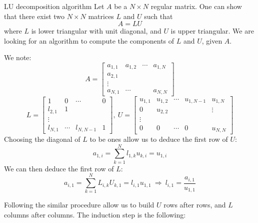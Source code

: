 \begin{section}{LU decomposition algorithm}
  Let $A$ be a $N\times N$ regular matrix. One can show that there
  exist two $N\times N$ matrices $L$ and $U$ such that
  \begin{equation}
    A = LU
  \end{equation}
  where $L$ is lower triangular with unit diagonal, and $U$ is upper
  triangular. We are looking for an algorithm to compute the
  components of $L$ and $U$, given $A$.

  We note:
  \begin{equation}
    A = 
    \begin{bmatrix}
      a_{1,1} & a_{1,2} &\cdots & a_{1,N}\\
      a_{2,1}\\
      \vdots\\
      a_{N,1} & \cdots & & a_{N,N}
    \end{bmatrix}
  \end{equation}
  \begin{equation}
    L = 
    \begin{bmatrix}
      1 & 0 &\cdots & 0\\
      l_{2,1} & 1\\
      \vdots\\
      l_{N,1} & \cdots & l_{N,N-1} & 1
    \end{bmatrix},\ 
    U = 
    \begin{bmatrix}
      u_{1,1}& u_{1,2} & \cdots & u_{1,N-1} & u_{1,N}\\
      0 & u_{2,2} & & &\vdots\\
      \vdots\\
      0 & 0 &\cdots  & 0 & u_{N,N}
    \end{bmatrix}    
  \end{equation}
  Choosing the diagonal of $L$ to be ones allow us to deduce the first
  row of $U$:
  \begin{equation}
    a_{1,i} = \sum_{k = 1}^Nl_{1,k}u_{k,i} = u_{1,i}
  \end{equation}
  We can then deduce the first row of $L$:
  \begin{equation}
    a_{i,1} = \sum_{k = 1}^NL_{i,k}U_{k,1} = l_{i,1}u_{1,1}\ \Rightarrow\ l_{i,1} = \frac{a_{i,1}}{u_{1,1}}
  \end{equation}
  
  Following the similar procedure allow us to build $U$ rows after
  rows, and $L$ columns after columns. The induction step is the
  following:
  

\end{section}
